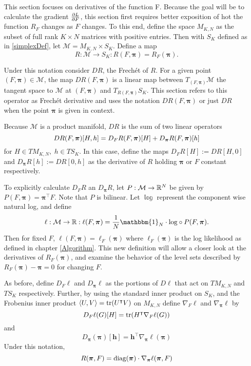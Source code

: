 \label{sect:dRdPiANDdRdF}
This section focuses on derivatives of the function \Rpi F. Because the goal will be to calculate the gradient \( \pdv{L}{F} \), this section first requires better exposition of hot the function \( R_F \) changes as \( F \) changes. To this end, define the space $M_{K,N}$ as the subset of full rank $K\times N$ matrices with positive entries.  Then with $S_K$ defined as in \ref{simplexDef}, let $\mathcal{M}=M_{K,N}\times S_K$. Define a map
\begin{equation}\label{manifoldResp}
R:\mathcal{M}\rightarrow S_K:R(F,\bm\pi) = R_F(\bm\pi).
\end{equation}

Under this notation consider $DR$, the Frech\'et of $R$.  For a given point $(F,\bm\pi)\in \mathcal{M}$, the map $DR(F,\bm\pi)$ is a linear map between $T_{(F,\bm\pi)}\mathcal{M}$ the tangent space to $\mathcal{M}$ at $(F,\bm\pi)$ and $T_{R(F,\bm\pi)}S_K$.  This section refers to this operator as Frech\'et derivative and uses the notation $DR(F,\bm\pi)$ or just $DR$ when the point \( \bm\pi \) is given in context.

Because $\mathcal{M}$ is a product manifold, $DR$ is the sum of two linear operators
\begin{equation*}
DR(F,\bm\pi)[H,h] = D_FR(F,\bm\pi)[H] + D_{\bm\pi}R(F,\bm\pi)[h]  \\
\end{equation*}
for \( H\in TM_{K,N},\; h\in TS_K\). In this case, define the maps $D_FR[H]:=DR[H,0]$ and $D_{\bm\pi}R[h]:=DR[0,h]$ as the derivative of $R$ holding $\bm\pi$ or $F$ constant respectively.

To explicitly calculate \( D_FR \) an \( D_{\bm\pi}R \), let $P:\mathcal{M}\rightarrow \mathbb R^{N}$ be given by $P(F,\bm\pi)=\bm\pi^{\intercal}F$.  Note that $P$ is bilinear. Let $\mathbb{\log}$ represent the component wise natural log, and define 
\[\ell:\mathcal{M}\rightarrow \R:\ell(F,\bm\pi)=\frac{1}{N}\mathbbm{1}_N\cdot\mathbb{\log}\circ P(F,\bm\pi).\]
Then for fixed $F$, $\ell(F,\bm\pi)=\ell_F(\bm\pi)$ where $\ell_F(\bm\pi)$ is the log likelihood as defined in chapter \ref{Algorithm}.  This new definition will allow a closer look at the derivatives of $R_F(\bm\pi)$, and examine the behavior of the level sets described by $R_F(\bm\pi)-\bm\pi=0$ for changing $F$.

As before, define $D_F\ell$ and $D_{\bm\pi}\ell$ as the portions of $D\ell$ that act on $TM_{K,N}$ and $TS_K$ respectively.  Further, by using the standard inner product on $S_K$, and the Frobenius inner product $\langle U,V\rangle=\operatorname{tr}(U^{\intercal}V)$ on $M_{K,N}$ define $\nabla_F\ell$ and $\nabla_{\bm\pi}\ell$ by
\[D_F\ell(G)[H]=\operatorname{tr}(H^{\intercal}\nabla_F\ell(G))\]
and
\begin{equation}\label{gradEll}
D_{\bm\pi}(\bm \pi)[\bm h]=\bm h^{\intercal}\nabla_{\bm\pi}\ell(\bm\pi)
\end{equation}
Under this notation, 
\begin{equation}\label{rGradDef}
R(\bm\pi,F)=\operatorname{diag}(\bm\pi)\cdot\nabla_{\bm\pi}\ell(\bm\pi,F)
\end{equation}

